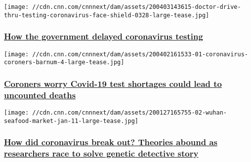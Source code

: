 \href{/2020/04/09/politics/coronavirus-testing-cdc-fda-red-tape-invs/index.html}{}

\texttt{[image: //cdn.cnn.com/cnnnext/dam/assets/200403143615-doctor-drive-thru-testing-coronavirus-face-shield-0328-large-tease.jpg]}

\hypertarget{how-the-government-delayed-coronavirus-testing}{%
\subsubsection{\texorpdfstring{\href{/2020/04/09/politics/coronavirus-testing-cdc-fda-red-tape-invs/index.html}{How
the government delayed coronavirus
testing}}{How the government delayed coronavirus testing}}\label{how-the-government-delayed-coronavirus-testing}}

\href{/2020/04/06/health/coronavirus-coroners-uncounted-deaths-invs/index.html}{}

\texttt{[image: //cdn.cnn.com/cnnnext/dam/assets/200402161533-01-coronavirus-coroners-barnum-4-large-tease.jpg]}

\hypertarget{coroners-worry-covid-19-test-shortages-could-lead-to-uncounted-deaths}{%
\subsubsection{\texorpdfstring{\href{/2020/04/06/health/coronavirus-coroners-uncounted-deaths-invs/index.html}{Coroners
worry Covid-19 test shortages could lead to uncounted
deaths}}{Coroners worry Covid-19 test shortages could lead to uncounted deaths}}\label{coroners-worry-covid-19-test-shortages-could-lead-to-uncounted-deaths}}

\href{/2020/04/06/us/coronavirus-scientists-debate-origin-theories-invs/index.html}{}

\texttt{[image: //cdn.cnn.com/cnnnext/dam/assets/200127165755-02-wuhan-seafood-market-jan-11-large-tease.jpg]}

\hypertarget{how-did-coronavirus-break-out-theories-abound-as-researchers-race-to-solve-genetic-detective-story}{%
\subsubsection{\texorpdfstring{\href{/2020/04/06/us/coronavirus-scientists-debate-origin-theories-invs/index.html}{How
did coronavirus break out? Theories abound as researchers race to solve
genetic detective
story}}{How did coronavirus break out? Theories abound as researchers race to solve genetic detective story}}\label{how-did-coronavirus-break-out-theories-abound-as-researchers-race-to-solve-genetic-detective-story}}

